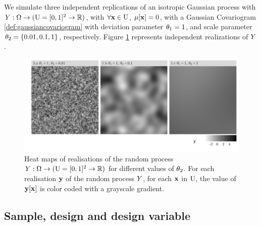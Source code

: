 \begin{example}\label{example:main}

%
We simulate three independent replications of an isotropic Gaussian process with $Y:\Omega\to(\mathrm{U}=[0,1]^2\to\mathbb{R})$, with $\forall \mathbf{x}\in\mathrm{U}$, $\mathrm{\mu}[\mathbf{x}]=0$, with a Gaussian Covariogram \eqref{def:gaussiancovariogram} with deviation parameter
 $\theta_1=1$, and scale parameter $\theta_2=\lbrace 0.01, 0.1, 1\rbrace$, respectively.
Figure \ref{fig:oaijsfdoij} represents independent realizations of $Y$.
\begin{figure}[H]
    \caption{Heat maps of realisations of the random process $Y:\Omega\to(\mathrm{U}=[0,1]^2\to\mathbb{R})$ for different values of $\theta_2$. For each realisation $\mathbf{y}$ of the random process $Y$, for each $\mathbf{x}$ in $\mathrm{U}$, the value of $\mathbf{y}[\mathbf{x}]$ is color coded with a grayscale gradient.}
    \label{fig:oaijsfdoij}
\includegraphics{fig/figure1.png}
\end{figure}

\end{example}


\subsection{Sample, design and design variable} \label{sec:design}
